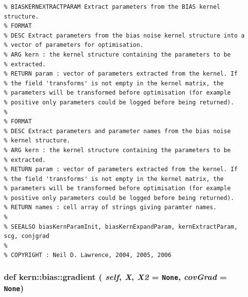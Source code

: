 \footnotesize\begin{verbatim}% BIASKERNEXTRACTPARAM Extract parameters from the BIAS kernel structure.
% FORMAT
% DESC Extract parameters from the bias noise kernel structure into a
% vector of parameters for optimisation.
% ARG kern : the kernel structure containing the parameters to be
% extracted.
% RETURN param : vector of parameters extracted from the kernel. If
% the field 'transforms' is not empty in the kernel matrix, the
% parameters will be transformed before optimisation (for example
% positive only parameters could be logged before being returned).
%
% FORMAT
% DESC Extract parameters and parameter names from the bias noise
% kernel structure.
% ARG kern : the kernel structure containing the parameters to be
% extracted.
% RETURN param : vector of parameters extracted from the kernel. If
% the field 'transforms' is not empty in the kernel matrix, the
% parameters will be transformed before optimisation (for example
% positive only parameters could be logged before being returned).
% RETURN names : cell array of strings giving paramter names.
%
% SEEALSO biasKernParamInit, biasKernExpandParam, kernExtractParam, scg, conjgrad
%
% COPYRIGHT : Neil D. Lawrence, 2004, 2005, 2006

\end{verbatim}
\normalsize
 \hypertarget{classkern_1_1bias_7a982606235bcbcee2cbd4b1d1cabef7}{
\subsubsection[{gradient}]{\setlength{\rightskip}{0pt plus 5cm}def kern::bias::gradient ( {\em self}, \/   {\em X}, \/   {\em X2} = {\tt None}, \/   {\em covGrad} = {\tt None})}}
\label{classkern_1_1bias_7a982606235bcbcee2cbd4b1d1cabef7}




